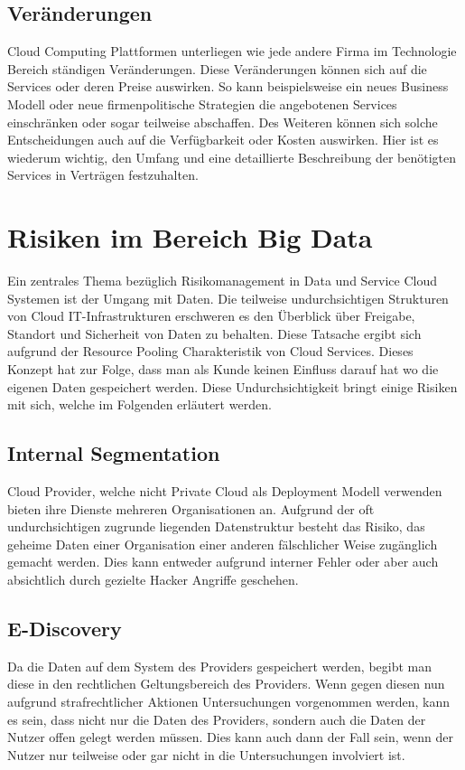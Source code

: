 \documentclass[a4paper,11pt]{article}
\begin{document}
\subsection{Veränderungen}
Cloud Computing Plattformen unterliegen wie jede andere Firma im Technologie Bereich ständigen Veränderungen. Diese Veränderungen können sich auf die Services oder deren Preise auswirken. So kann beispielsweise ein neues Business Modell oder neue firmenpolitische Strategien die angebotenen Services einschränken oder sogar teilweise abschaffen. Des Weiteren können sich solche Entscheidungen auch auf die Verfügbarkeit oder Kosten auswirken. Hier ist es wiederum wichtig, den Umfang und eine detaillierte Beschreibung der benötigten Services in Verträgen festzuhalten. \cite{mos2011}


\section{Risiken im Bereich Big Data}
Ein zentrales Thema bezüglich Risikomanagement in Data und Service Cloud Systemen ist der Umgang mit Daten. Die teilweise undurchsichtigen Strukturen von Cloud IT-Infrastrukturen erschweren es den Überblick über Freigabe, Standort und Sicherheit von Daten zu behalten. Diese Tatsache ergibt sich aufgrund der Resource Pooling Charakteristik von Cloud Services. Dieses Konzept hat zur Folge, dass man als Kunde keinen Einfluss darauf hat wo die eigenen Daten gespeichert werden. Diese Undurchsichtigkeit bringt einige Risiken mit sich, welche im Folgenden erläutert werden. 

\subsection{Internal Segmentation}
Cloud Provider, welche nicht Private Cloud als Deployment Modell verwenden bieten ihre Dienste mehreren Organisationen an. Aufgrund der oft undurchsichtigen zugrunde liegenden Datenstruktur besteht das Risiko, das geheime Daten einer Organisation einer anderen fälschlicher Weise zugänglich gemacht werden. Dies kann entweder aufgrund interner Fehler oder aber auch absichtlich durch gezielte Hacker Angriffe geschehen. \cite{mos2011}

\subsection{E-Discovery}
Da die Daten auf dem System des Providers gespeichert werden, begibt man diese in den rechtlichen Geltungsbereich des Providers. Wenn gegen diesen nun aufgrund strafrechtlicher Aktionen Untersuchungen vorgenommen werden, kann es sein, dass nicht nur die Daten des Providers, sondern auch die Daten der Nutzer offen gelegt werden müssen. Dies kann auch dann der Fall sein, wenn der Nutzer nur teilweise oder gar nicht in die Untersuchungen involviert ist. \cite{mos2011}
\end{document}
